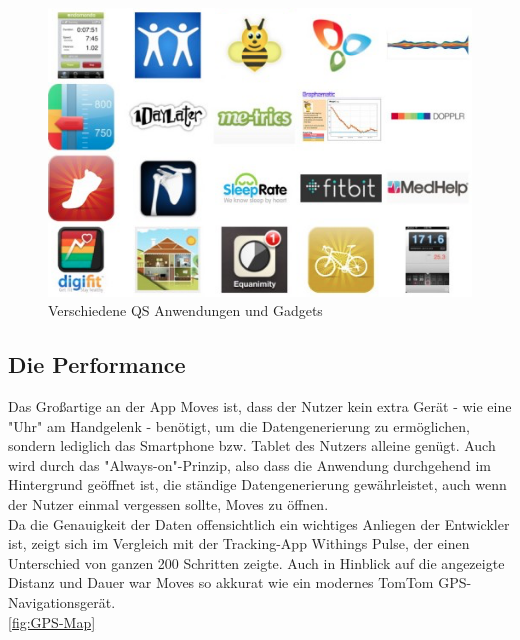\begin{figure}[h]
\centering
\includegraphics[scale=0.3]{images/qs-anwndungen-gadgets.png}
\caption{Verschiedene QS Anwendungen und Gadgets \cite{fig:Anwendungen}}
\label{fig:Anwendungen}
\end{figure}

\subsection{Die Performance}
\label{ch:Apps:sec:Moves:subsec:PERF}

Das Großartige an der App Moves ist, dass der Nutzer kein extra Gerät - wie eine "Uhr" am Handgelenk - benötigt, um die Datengenerierung zu ermöglichen, sondern lediglich das Smartphone bzw. Tablet des Nutzers alleine genügt. 
Auch wird durch das "Always-on"-Prinzip, also dass die Anwendung durchgehend im Hintergrund geöffnet ist, die ständige Datengenerierung gewährleistet, auch wenn der Nutzer einmal vergessen sollte, Moves zu öffnen.
\\
Da die Genauigkeit der Daten offensichtlich ein wichtiges Anliegen der Entwickler ist, zeigt sich im Vergleich mit der Tracking-App Withings Pulse, der einen Unterschied von ganzen 200 Schritten zeigte. 
Auch in Hinblick auf die angezeigte Distanz und Dauer war Moves so akkurat wie ein modernes TomTom GPS-Navigationsgerät.
\\
\ref{fig:GPS-Map}

